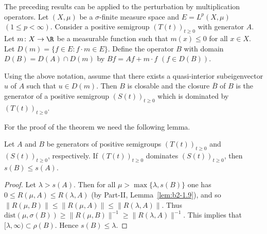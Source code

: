 The preceding results can be applied to the perturbation by multiplication operators. 
Let $(X,\mu)$ be a $\sigma$-finite measure space and $E = L^{p}(X,\mu)$ $(1 \leq p < \infty)$. 
Consider a positive semigroup $(T(t))_{t \geq 0}$ with generator $A$. 
Let $m \colon X \to \R$ be a measurable function such that $m(x) \leq 0$ for all $x \in X$. 
Let $D(m) = \{f \in E \colon f \cdot m \in E\}$. 
Define the operator $B$ with domain $D(B) = D(A) \cap D(m)$ by $Bf = Af + m \cdot f$ $(f \in D(B))$. 
\begin{theorem}\label{thm:c2-4.9}
Using the above notation, assume that there exists a quasi-interior subeigenvector $u$ of\/ $A$
such that $u \in D(m)$. Then $B$ is closable and the closure $\overline{B}$ of\/ $B$ is the generator of a positive semigroup $(S(t))_{t \geq 0}$ which is dominated by $(T(t))_{t \geq 0}$.
\end{theorem}
For the proof of the theorem we need the following lemma.
\begin{lemma}\label{lem:c2-4.10}
Let $A$ and $B$ be generators of positive semigroups
$(T(t))_{t \geq 0}$ and $(S(t))_{t \geq 0}$, respectively.
If\/ $(T(t))_{t \geq 0}$ dominates
$(S(t))_{t \geq 0}$, then $s(B) \leq s(A)$.
\end{lemma}
\begin{proof}%
Let $\lambda > s(A)$.
Then for all $\mu > \max \{\lambda,s(B)\}$ one has $0 \leq R(\mu,A) \leq R(\lambda,A)$ 
(by Part-II, Lemma~\ref{lem:b2-1.9}), and so $\|R(\mu,B)\| \leq  \|R(\mu,A)\| \leq \|R(\lambda,A)\|$.
Thus $\text{dist}(\mu,\sigma(B)) \geq \|R(\mu,B)\|^{-1} \geq \|R(\lambda,A)\|^{-1}$.
This implies that $[\lambda,\infty) \subset \rho(B)$.
Hence $s(B) \leq \lambda$.
\end{proof}

